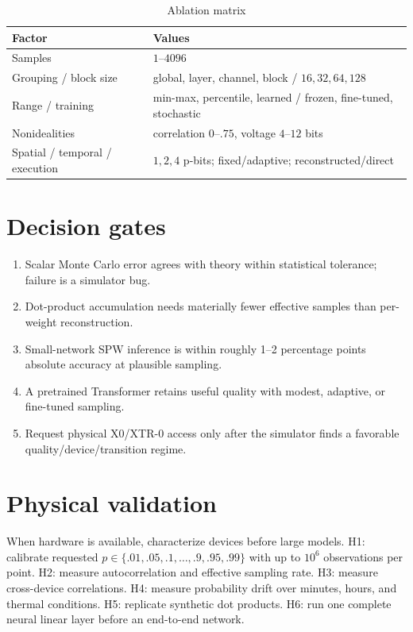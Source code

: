 \documentclass[11pt]{article}
\begin{document}
\begin{table}[h]
\centering
\caption{Ablation matrix}
\begin{tabular}{ll}\toprule
Factor & Values \\\midrule
Samples & $1$--$4096$ \\
Grouping / block size & global, layer, channel, block / $16,32,64,128$ \\
Range / training & min-max, percentile, learned / frozen, fine-tuned, stochastic \\
Nonidealities & correlation $0$--$.75$, voltage $4$--$12$ bits \\
Spatial / temporal / execution & $1,2,4$ p-bits; fixed/adaptive; reconstructed/direct \\\bottomrule
\end{tabular}
\end{table}

\section{Decision gates}
\begin{enumerate}[label=Gate \Alph*.,leftmargin=*]
\item Scalar Monte Carlo error agrees with theory within statistical tolerance; failure is a simulator bug.
\item Dot-product accumulation needs materially fewer effective samples than per-weight reconstruction.
\item Small-network SPW inference is within roughly 1--2 percentage points absolute accuracy at plausible sampling.
\item A pretrained Transformer retains useful quality with modest, adaptive, or fine-tuned sampling.
\item Request physical X0/XTR-0 access only after the simulator finds a favorable quality/device/transition regime.
\end{enumerate}

\section{Physical validation}
When hardware is available, characterize devices before large models. H1: calibrate requested
$p\in\{.01,.05,.1,\ldots,.9,.95,.99\}$ with up to $10^6$ observations per point. H2:
measure autocorrelation and effective sampling rate. H3: measure cross-device correlations.
H4: measure probability drift over minutes, hours, and thermal conditions. H5: replicate
synthetic dot products. H6: run one complete neural linear layer before an end-to-end network.
\end{document}
